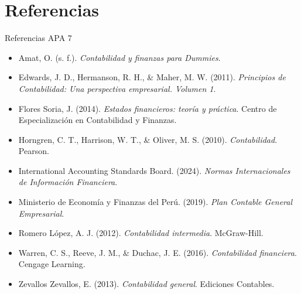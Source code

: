 \section{Referencias}

\begin{frame}{Referencias APA 7}
  \tiny
  \begin{itemize}
    \item Amat, O. (s. f.). \textit{Contabilidad y finanzas para Dummies}.
    \item Edwards, J. D., Hermanson, R. H., \& Maher, M. W. (2011). \textit{Principios de Contabilidad: Una perspectiva empresarial. Volumen 1}.
    \item Flores Soria, J. (2014). \textit{Estados financieros: teoría y práctica}. Centro de Especialización en Contabilidad y Finanzas.
    \item Horngren, C. T., Harrison, W. T., \& Oliver, M. S. (2010). \textit{Contabilidad}. Pearson.
    \item International Accounting Standards Board. (2024). \textit{Normas Internacionales de Información Financiera}.
    \item Ministerio de Economía y Finanzas del Perú. (2019). \textit{Plan Contable General Empresarial}.
    \item Romero López, A. J. (2012). \textit{Contabilidad intermedia}. McGraw-Hill.
    \item Warren, C. S., Reeve, J. M., \& Duchac, J. E. (2016). \textit{Contabilidad financiera}. Cengage Learning.
    \item Zevallos Zevallos, E. (2013). \textit{Contabilidad general}. Ediciones Contables.
  \end{itemize}
\end{frame}
